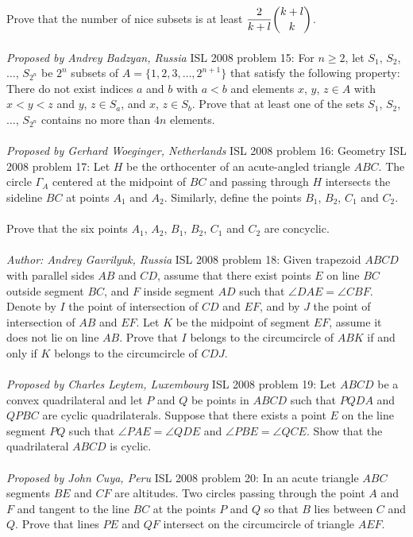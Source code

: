 Prove that the number of nice subsets is at least $ \dfrac{2}{k + l}\dbinom{k + l}{k}$. \\\\
\textit{Proposed by Andrey Badzyan, Russia} 
ISL 2008 problem 15:  For $ n\ge 2$, let $ S_1$, $ S_2$, $ \ldots$, $ S_{2^n}$ be $ 2^n$ subsets of $ A = \{1, 2, 3, \ldots, 2^{n + 1}\}$ that satisfy the following property: There do not exist indices $ a$ and $ b$ with $ a < b$ and elements $ x$, $ y$, $ z\in A$ with $ x < y < z$ and $ y$, $ z\in S_a$, and $ x$, $ z\in S_b$. Prove that at least one of the sets $ S_1$, $ S_2$, $ \ldots$, $ S_{2^n}$ contains no more than $ 4n$ elements. \\\\
\textit{Proposed by Gerhard Woeginger, Netherlands} 
ISL 2008 problem 16:  Geometry 
ISL 2008 problem 17:  Let $ H$ be the orthocenter of an acute-angled triangle $ ABC$. The circle $ \Gamma_A$ centered at the midpoint of $ BC$ and passing through $ H$ intersects the sideline $ BC$ at points  $ A_1$ and $ A_2$. Similarly, define the points $ B_1$, $ B_2$, $ C_1$ and $ C_2$. \\\\
Prove that the six points $ A_1$, $ A_2$, $ B_1$, $ B_2$, $ C_1$ and $ C_2$ are concyclic. \\\\
\textit{Author: Andrey Gavrilyuk, Russia} 
ISL 2008 problem 18:  Given trapezoid $ ABCD$ with parallel sides $ AB$ and $ CD$, assume that there exist points $ E$ on line $ BC$ outside segment $ BC$, and $ F$ inside segment $ AD$ such that $ \angle DAE = \angle CBF$. Denote by $ I$ the point of intersection of $ CD$ and $ EF$, and by $ J$ the point of intersection of $ AB$ and $ EF$. Let $ K$ be the midpoint of segment $ EF$, assume it does not lie on line $ AB$. Prove that $ I$ belongs to the circumcircle of $ ABK$ if and only if $ K$ belongs to the circumcircle of $ CDJ$. \\\\
\textit{Proposed by Charles Leytem, Luxembourg} 
ISL 2008 problem 19:  Let $ ABCD$ be a convex quadrilateral and let $ P$ and $ Q$ be points in $ ABCD$ such that $ PQDA$ and $ QPBC$ are cyclic quadrilaterals. Suppose that there exists a point $ E$ on the line segment $ PQ$ such that $ \angle PAE = \angle QDE$ and $ \angle PBE = \angle QCE$. Show that the quadrilateral $ ABCD$ is cyclic. \\\\
\textit{Proposed by John Cuya, Peru} 
ISL 2008 problem 20:  In an acute triangle $ ABC$ segments $ BE$ and $ CF$ are altitudes. Two circles passing through the point $ A$ and $ F$ and tangent to the line $ BC$ at the points $ P$ and $ Q$ so that $ B$ lies between $ C$ and $ Q$. Prove that lines $ PE$ and $ QF$ intersect on the circumcircle of triangle $ AEF$. \\\\
